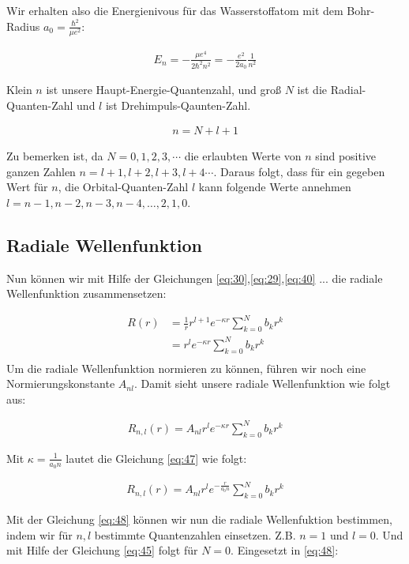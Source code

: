 Wir erhalten also die Energienivous für das Wasserstoffatom mit dem Bohr-Radius \(a_0 = \frac{\hbar^2}{\mu e^2}\):

\begin{align}
  \label{eq:46}
  \boxed{E_n =  - \frac{\mu e^4}{2\hbar^2 n^2} = -  \frac{e^2}{2a_0}\frac{1}{n^2} }
\end{align}

Klein \(n\) ist unsere Haupt-Energie-Quantenzahl, und groß \(N\) ist die Radial-Quanten-Zahl und \(l\) ist Drehimpuls-Qaunten-Zahl.

\begin{align}
  \label{eq:45}
  n = N+l+1
\end{align}

Zu bemerken ist, da \(N=0,1,2,3,\cdots\) die erlaubten Werte von \(n\) sind positive ganzen Zahlen \(n=l+1,l+2,l+3,l+4\cdots\). Daraus folgt, dass für ein gegeben Wert für \(n\), die Orbital-Quanten-Zahl \(l\) kann folgende Werte annehmen \(l=n-1,n-2,n-3,n-4,\dots,2,1,0\).


\subsection{Radiale Wellenfunktion}

Nun können wir mit Hilfe der Gleichungen \eqref{eq:30},\eqref{eq:29},\eqref{eq:40} ... die radiale Wellenfunktion zusammensetzen:

\begin{align}
  \label{eq:33}
  R(r) &= \frac{1}{r} r^{l+1}e^{-\kappa r}\sum^{N}_{k=0} b_kr^k \\
&= r^{l}e^{-\kappa r}\sum^{N}_{k=0} b_kr^k \\
\end{align}
Um die radiale Wellenfunktion normieren zu können, führen wir noch eine Normierungskonstante \(A_{nl}\). Damit sieht unsere radiale Wellenfunktion wie folgt aus:

\begin{align}
  \label{eq:47}
   R_{n,l}(r) = A_{nl}r^{l}e^{-\kappa r}\sum^{N}_{k=0} b_kr^k
\end{align}

Mit \(\kappa = \frac{1}{a_0 n}\) lautet die Gleichung \eqref{eq:47} wie folgt:

\begin{align}
  \label{eq:48}
   \boxed{R_{n,l}(r) = A_{nl}r^{l}e^{-\frac{r}{a_0 n}}\sum^{N}_{k=0} b_kr^k}
\end{align}

Mit der Gleichung \eqref{eq:48} können wir nun die radiale Wellenfuktion bestimmen, indem wir für \(n,l\) bestimmte Quantenzahlen einsetzen. Z.B. \(n=1\) und \(l=0\). Und mit Hilfe der Gleichung \eqref{eq:45} folgt für \(N=0\). Eingesetzt in \eqref{eq:48}:

